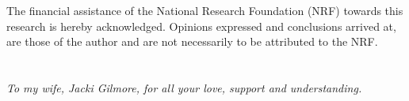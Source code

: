 The financial assistance of the National Research Foundation (NRF) towards this research is hereby acknowledged. Opinions expressed and conclusions arrived at, are those of the author and are not necessarily to be attributed to the NRF.

\chapter*{}%
 \vfill
 \begin{center}\itshape
    To my wife, Jacki Gilmore, for all your love, support and understanding.
 \end{center}
 \vfill
 \clearpage

\endinput
